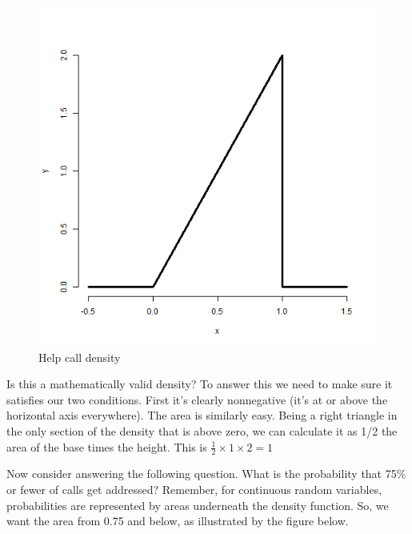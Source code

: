 \documentclass[]{article}
\begin{document}
\begin{figure}[htbp]
\centering
\includegraphics{LeanPub/images/triangleDensity-1.png}
\caption{Help call density}
\end{figure}

Is this a mathematically valid density? To answer this we need to make
sure it satisfies our two conditions. First it's clearly nonnegative
(it's at or above the horizontal axis everywhere). The area is similarly
easy. Being a right triangle in the only section of the density that is
above zero, we can calculate it as 1/2 the area of the base times the
height. This is $\frac{1}{2} \times 1 \times 2 = 1$

Now consider answering the following question. What is the probability
that 75\% or fewer of calls get addressed? Remember, for continuous
random variables, probabilities are represented by areas underneath the
density function. So, we want the area from 0.75 and below, as
illustrated by the figure below.
\end{document}
